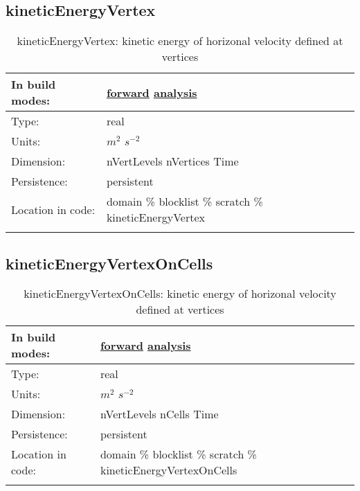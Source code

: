 \subsection[kineticEnergyVertex]{kineticEnergyVertex}
\label{subsec:var_sec_scratch_kineticEnergyVertex}
\begin{center}
\begin{longtable}{| p{2.0in} | p{4.0in} |}
        \hline 
        In build modes: & \hyperref[subsec:forward_var_tab_scratch]{forward} \hyperref[subsec:analysis_var_tab_scratch]{analysis} \\
        \hline 
        Type: & real \\
        \hline 
        Units: & $m^2$ $s^{-2}$ \\
        \hline 
        Dimension: & nVertLevels nVertices Time \\
        \hline 
        Persistence: & persistent \\
        \hline 
		 Location in code: & domain \% blocklist \% scratch \% kineticEnergyVertex \\
		 \hline 
    \caption{kineticEnergyVertex: kinetic energy of horizonal velocity defined at vertices}
\end{longtable}
\end{center}
\subsection[kineticEnergyVertexOnCells]{kineticEnergyVertexOnCells}
\label{subsec:var_sec_scratch_kineticEnergyVertexOnCells}
\begin{center}
\begin{longtable}{| p{2.0in} | p{4.0in} |}
        \hline 
        In build modes: & \hyperref[subsec:forward_var_tab_scratch]{forward} \hyperref[subsec:analysis_var_tab_scratch]{analysis} \\
        \hline 
        Type: & real \\
        \hline 
        Units: & $m^2$ $s^{-2}$ \\
        \hline 
        Dimension: & nVertLevels nCells Time \\
        \hline 
        Persistence: & persistent \\
        \hline 
		 Location in code: & domain \% blocklist \% scratch \% kineticEnergyVertexOnCells \\
		 \hline 
    \caption{kineticEnergyVertexOnCells: kinetic energy of horizonal velocity defined at vertices}
\end{longtable}
\end{center}
